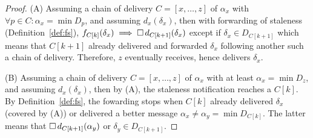 \begin{proof}
  (A) Assuming a chain of delivery $C = [x, \ldots, z]$ of $\alpha_x$
  with $\forall p \in C: \alpha_x = \min D_p$, and assuming
  $d_x(\delta_x)$, then with forwarding of staleness
  (Definition~\ref{def:fs}), $f_{C[k]}(\delta_x) \implies \square\,
  d_{C[k+1]}(\delta_x)$ except if $\delta_x \in D_{C[k+1]}$ which
  means that $C[k+1]$ already delivered and forwarded $\delta_x$
  following another such a chain of delivery. Therefore, $z$
  eventually receives, hence delivers $\delta_x$.

  \noindent (B) Assuming a chain of delivery $C = [x, \ldots, z]$ of
  $\alpha_x$ with at least $\alpha_x = \min D_z$, and assuming
  $d_x(\delta_x)$, then by (A), the staleness notification reaches a
  \process $C[k]$. By Definition~\ref{def:fs}, the fowarding stops
  when $C[k]$ already delivered $\delta_x$ (covered by (A)) or
  delivered a better message $\alpha_x \neq \alpha_y = \min
  D_{C[k]}$. The latter means that $\square\, d_{C[k+1]}(\alpha_y)$
  or $\delta_y \in D_{C[k+1]}$.

  
  
  

\end{proof}
